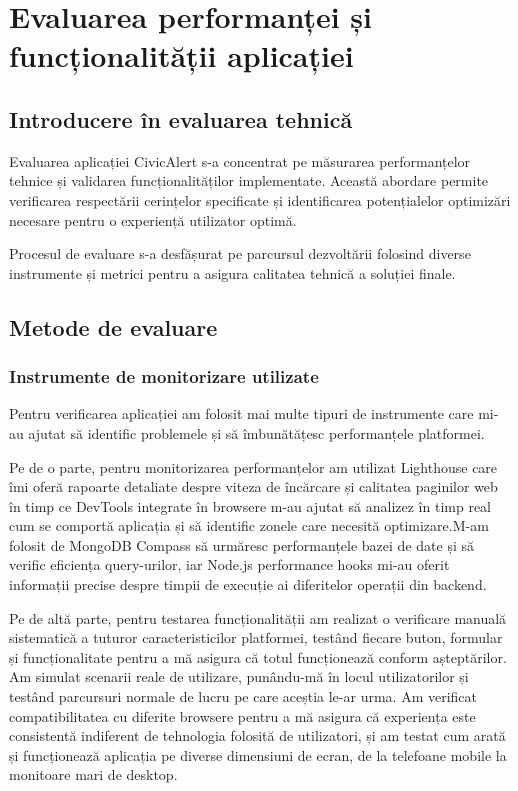 \documentclass[12pt,a4paper]{report}
\begin{document}
\chapter{Evaluarea performanței și funcționalității aplicației}

\section{Introducere în evaluarea tehnică}

Evaluarea aplicației CivicAlert s-a concentrat pe măsurarea performanțelor tehnice și validarea funcționalităților implementate. Această abordare permite verificarea respectării cerințelor specificate și identificarea potențialelor optimizări necesare pentru o experiență utilizator optimă.

Procesul de evaluare s-a desfășurat pe parcursul dezvoltării folosind diverse instrumente și metrici pentru a asigura calitatea tehnică a soluției finale.

\section{Metode de evaluare}

\subsection{Instrumente de monitorizare utilizate}

Pentru verificarea aplicației am folosit mai multe tipuri de instrumente care mi-au ajutat să identific problemele și să îmbunătățesc performanțele platformei.

Pe de o parte, pentru  monitorizarea performanțelor am utilizat Lighthouse care îmi oferă rapoarte detaliate despre viteza de încărcare și calitatea paginilor web în timp ce DevTools integrate în browsere m-au ajutat să analizez în timp real cum se comportă aplicația și să identific zonele care necesită optimizare.M-am folosit de  MongoDB Compass  să urmăresc performanțele bazei de date și să verific eficiența query-urilor, iar Node.js performance hooks mi-au oferit informații precise despre timpii de execuție ai diferitelor operații din backend.

Pe de altă parte, pentru testarea funcționalității am realizat o verificare manuală sistematică a tuturor caracteristicilor platformei, testând fiecare buton, formular și funcționalitate pentru a mă asigura că totul funcționează conform așteptărilor. Am simulat scenarii reale de utilizare, punându-mă în locul utilizatorilor și testând parcursuri normale de lucru pe care aceștia le-ar urma. Am verificat compatibilitatea cu diferite browsere pentru a mă asigura că experiența este consistentă indiferent de tehnologia folosită de utilizatori, și am testat cum arată și funcționează aplicația pe diverse dimensiuni de ecran, de la telefoane mobile la monitoare mari de desktop.
\end{document}
